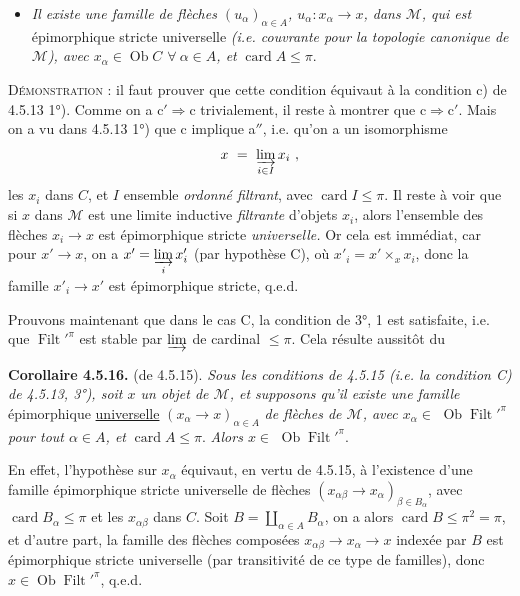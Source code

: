 \documentclass[11pt]{article}
\newcommand{\printedpage}[1]{\marginpar{\footnotesize p.~#1}}
\newcommand{\msp}[1]{\marginpar{\footnotesize [#1]}}
\newcommand{\Filt}{\operatorname{Filt}}
\newcommand{\card}{\operatorname{card}}
\newcommand{\Ob}{\operatorname{Ob}}
\begin{document}
\printedpage{43}
\begin{itemize}
\item[\textit{c$'$)}] \textit{Il existe une famille de flèches $(u_{\alpha})_{\alpha\in A}$, $u_{\alpha} : x_{\alpha} \longrightarrow x$, dans $\mathcal{M}$, qui est} épimorphique stricte universelle \textit{(i.e. couvrante pour la topologie canonique de $\mathcal{M}$), avec $x_{\alpha} \in \Ob C$ $\forall\ \alpha \in A$, et} $\card A \leqslant \pi$.
\end{itemize}
\textsc{Démonstration} : il faut prouver que cette condition équivaut à la condition c) de 4.5.13 1°). Comme on a $\mathrm{c}' \Longrightarrow \mathrm{c}$ trivialement, il reste à montrer que $\mathrm{c} \Longrightarrow \mathrm{c}'$. Mais on a vu dans 4.5.13 1°) que c implique a$''$, i.e. qu'on a un isomorphisme
\[ x \ = \ \varinjlim_{i\in I} x_i \ , \]
les $x_i$ dans $C$, et $I$ ensemble \textit{ordonné filtrant}, avec $\card I \leqslant \pi$. Il reste à voir que si $x$ dans $\mathcal{M}$ est une limite inductive \textit{filtrante} d'objets $x_i$, alors l'ensemble des flèches $x_i \longrightarrow x$ est épimorphique stricte \textit{universelle.} Or cela est immédiat, car pour $x' \longrightarrow x$, on a $x' = \varinjlim\limits_{i} x'_i$ (par hypothèse C), où $x'_i = x' \times_x x_i$, donc la famille $x'_i \longrightarrow x'$ est épimorphique stricte, q.e.d.

Prouvons maintenant que dans le cas C, la condition de 3°, 1 est satisfaite, i.e. que $\Filt'^{\pi}$ est stable par $\varinjlim$ de cardinal $\leqslant \pi$. Cela
\msp{page 137}
résulte aussitôt du

\textbf{Corollaire 4.5.16.} (de 4.5.15). \textit{Sous les conditions de 4.5.15 (i.e. la condition C) de 4.5.13, 3°), soit $x$ un objet de $\mathcal{M}$, et supposons qu'il existe une famille} épimorphique \underline{universelle} $(x_{\alpha} \longrightarrow x)_{\alpha\in A}$ \textit{de flèches de $\mathcal{M}$, avec $x_{\alpha} \in$} $\Ob \Filt'^{\pi}$ \textit{pour tout $\alpha \in A$, et} $\card A \leqslant \pi$. \textit{Alors $x \in$} $\Ob \Filt'^{\pi}$.

En effet, l'hypothèse sur $x_{\alpha}$ équivaut, en vertu de 4.5.15, à l'existence d'une famille épimorphique stricte universelle de flèches $(x_{\alpha\beta} \longrightarrow x_{\alpha})_{\beta\in B_{\alpha}}$, avec $\card B_{\alpha} \leqslant \pi$ et les $x_{\alpha\beta}$ dans $C$. Soit $B = \coprod_{\alpha\in A} B_{\alpha}$, on a alors $\card B \leqslant \pi^2 = \pi$, et d'autre part, la famille des flèches composées $x_{\alpha\beta} \longrightarrow x_{\alpha} \longrightarrow x$ indexée par $B$ est épimorphique stricte universelle (par transitivité de ce type de familles), donc $x \in \Ob \Filt'^{\pi}$, q.e.d.
\end{document}
